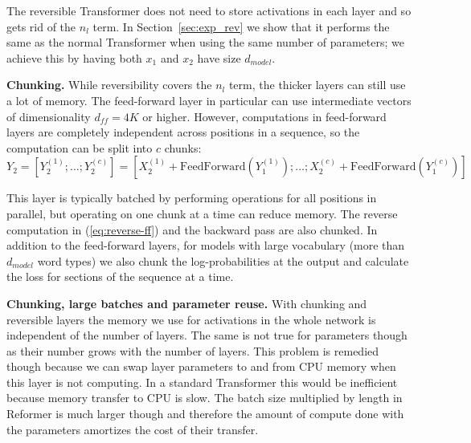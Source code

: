 \documentclass{article} %
\renewcommand{\paragraph}[1]{\textbf{#1}}
\begin{document}
The reversible Transformer does not need to store activations in each layer
and so gets rid of the $n_l$ term.  In Section~\ref{sec:exp_rev} we show that it performs the same as the normal Transformer when using  the same number of parameters; we achieve this by having both $x_1$ and $x_2$ have size $d_{model}$.

\paragraph{Chunking.}
While reversibility covers the $n_l$ term, the thicker layers can still use
a lot of memory. The feed-forward layer in particular can use intermediate vectors 
of dimensionality $d_{ff}=4K$ or higher. However, computations in feed-forward layers 
are completely independent across positions in a sequence, so the computation can be split 
into $c$ chunks:
%
\begin{equation}
    Y_2 = \left[Y_2^{(1)}; \ldots; Y_2^{(c)}\right] = \left[X_2^{(1)} + \mathrm{FeedForward}(Y_1^{(1)}); \ldots; X_2^{(c)} + \mathrm{FeedForward}(Y_1^{(c)})\right]
\end{equation}

This layer is typically batched by performing operations for all positions in parallel, but operating on one chunk at a time can reduce memory. The reverse computation in (\ref{eq:reverse-ff}) and the backward pass are also chunked.
%
In addition to the feed-forward layers, for models with large vocabulary (more than $d_{model}$ word types) we also chunk the log-probabilities at the output and calculate the loss for sections of the sequence at a time.

\paragraph{Chunking, large batches and parameter reuse.}
With chunking and reversible layers the memory we use for activations
in the whole network is independent of the number of layers. The same is
not true for parameters though as their number grows with the number of layers. This problem is remedied though because we can swap layer
parameters to and from CPU memory when this layer is not computing.
In a standard Transformer this would be inefficient because memory
transfer to CPU is slow. The batch size multiplied by length in Reformer
is much larger though and therefore the amount of compute done with the parameters amortizes the cost of their transfer.
\end{document}
